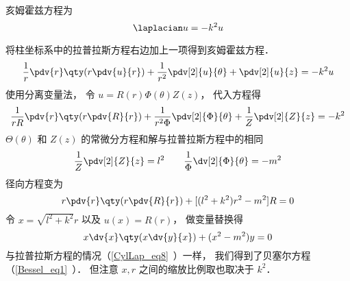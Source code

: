 
\begin{issues}
\issueDraft
\end{issues}


亥姆霍兹方程为
\begin{equation}
\laplacian u = -k^2 u
\end{equation}

将柱坐标系中的拉普拉斯方程右边加上一项得到亥姆霍兹方程．
\begin{equation}
\frac{1}{r} \pdv{r} \qty(r\pdv{u}{r}) + \frac{1}{r^2} \pdv[2]{u}{\theta} + \pdv[2]{u}{z} = -k^2 u
\end{equation}
使用分离变量法， 令 $u = R(r) \Phi(\theta) Z(z)$， 代入方程得
\begin{equation}
\frac{1}{rR}\pdv{r} \qty(r\pdv{R}{r}) + \frac{1}{r^2 \Phi} \pdv[2]{\Phi}{\theta} + \frac{1}{Z} \pdv[2]{Z}{z} = -k^2
\end{equation}
$\Theta(\theta)$ 和 $Z(z)$ 的常微分方程和解与拉普拉斯方程中的相同
\begin{equation}
\frac{1}{Z} \pdv[2]{Z}{z} = l^2 \qquad
\frac{1}{\Phi} \dv[2]{\Phi}{\theta} = -m^2
\end{equation}
径向方程变为
\begin{equation}
r\pdv{r} \qty(r\pdv{R}{r}) + [(l^2 + k^2)r^2 - m^2]R  = 0
\end{equation}
令 $x = \sqrt{l^2 + k^2}r$ 以及 $u(x) = R(r)$， 做变量替换得
\begin{equation}\label{CylHlm_eq1}
x \dv{x} \qty(x\dv{y}{x}) + (x^2 - m^2)y = 0
\end{equation}
与拉普拉斯方程的情况（\autoref{CylLap_eq8}~）一样， 我们得到了贝塞尔方程（\autoref{Bessel_eq1}~）． 但注意 $x, r$ 之间的缩放比例取也取决于 $k^2$．

